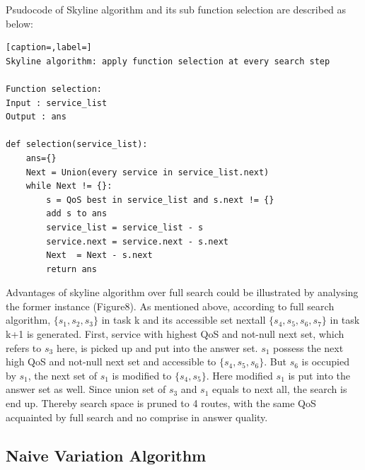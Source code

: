 \documentclass[senior,final,11pt]{iscs-thesis}
\begin{document}
Psudocode of Skyline algorithm and its sub function selection are described as below: 
\begin{lstlisting}[caption=,label=]
Skyline algorithm: apply function selection at every search step

Function selection:
Input : service_list
Output : ans

def selection(service_list):
	ans={}
	Next = Union(every service in service_list.next)
	while Next != {}:
		s = QoS best in service_list and s.next != {}
		add s to ans
		service_list = service_list - s
		service.next = service.next - s.next
		Next  = Next - s.next
		return ans
\end{lstlisting}

Advantages of skyline algorithm over full search could be illustrated by analysing the former instance (Figure8). As mentioned above, according to full search algorithm, $\{s_1,s_2,s_3\}$ in task k and its accessible set nextall $\{s_4,s_5,s_6,s_7\}$ in task k+1 is generated. First, service with highest QoS and not-null next set, which refers to $s_3$ here, is picked up and put into the answer set. $s_1$ possess the next high QoS and not-null next set and accessible to $\{s_4,s_5,s_6\}$. But $s_6$ is occupied by $s_1$, the next set of $s_1$ is modified to $\{s_4,s_5\}$. Here modified $s_1$ is put into the answer set as well. Since union set of $s_3$ and $s_1$ equals to next all, the search is end up. Thereby search space is pruned to 4 routes, with the same QoS acquainted by full search and no comprise in answer quality. 

\subsection{Naive Variation Algorithm}%
 
\end{document}
